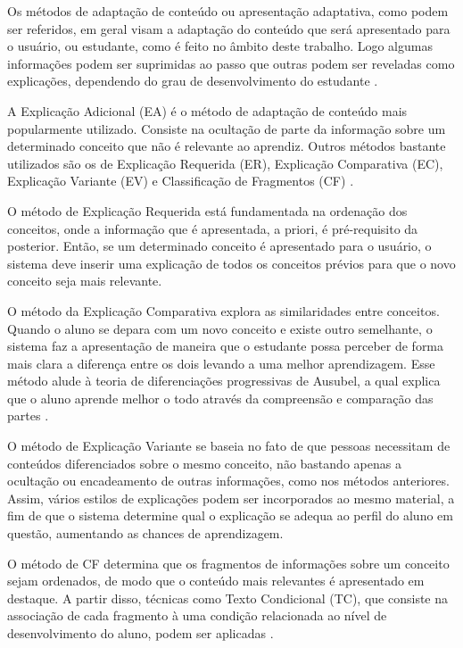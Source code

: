 Os métodos de adaptação de conteúdo ou apresentação adaptativa, como podem ser referidos, em geral visam a adaptação do conteúdo que será apresentado para o usuário, ou estudante, como é feito no âmbito deste trabalho. Logo algumas informações podem ser suprimidas ao passo que outras podem ser reveladas como explicações, dependendo do grau de desenvolvimento do estudante \cite{brusilovsky1996, fragelli2010, diniz2012}.

A Explicação Adicional (EA) é o método de adaptação de conteúdo mais popularmente utilizado. Consiste na ocultação de parte da informação sobre um determinado conceito que não é relevante ao aprendiz. Outros métodos bastante utilizados são os de Explicação Requerida (ER), Explicação Comparativa (EC), Explicação Variante (EV) e Classificação de Fragmentos (CF) \cite{brusilovsky1996, fragelli2010}. 

O método de Explicação Requerida está fundamentada na ordenação dos conceitos, onde a informação que é apresentada, a priori, é pré-requisito da posterior. Então, se um determinado conceito é apresentado para o usuário, o sistema deve inserir uma explicação de todos os conceitos prévios para que o novo conceito seja mais relevante.

O método da Explicação Comparativa explora as similaridades entre conceitos. Quando o aluno se depara com um novo conceito e existe outro semelhante, o sistema faz a apresentação de maneira que o estudante possa perceber de forma mais clara a diferença entre os dois levando a uma melhor aprendizagem. Esse método alude à teoria de diferenciações progressivas de Ausubel, a qual explica que o aluno aprende melhor o todo através da compreensão e comparação das partes \cite{brusilovsky1998, ausubel2000}.

O método de Explicação Variante se baseia no fato de que pessoas necessitam de conteúdos diferenciados sobre o mesmo conceito, não bastando apenas a ocultação ou encadeamento de outras informações, como nos métodos anteriores. Assim, vários estilos de explicações podem ser incorporados ao mesmo material, a fim de que o sistema determine qual o explicação se adequa ao perfil do aluno em questão, aumentando as chances de aprendizagem.

O método de CF determina que os fragmentos de informações sobre um conceito sejam ordenados, de modo que o conteúdo mais relevantes é apresentado em destaque. A partir disso, técnicas como Texto Condicional (TC), que consiste na associação de cada fragmento à uma condição relacionada ao nível de desenvolvimento do aluno, podem ser aplicadas \cite{brusilovsky1996}.

